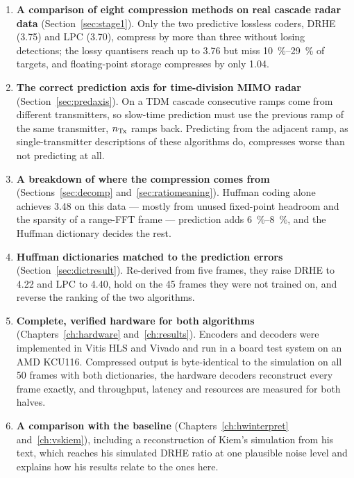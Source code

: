 \begin{enumerate}
\item \textbf{A comparison of eight compression methods on real cascade radar
data} (Section~\ref{sec:stage1}). Only the two predictive lossless coders, DRHE
(\num{3.75}) and LPC (\num{3.70}), compress by more than three without losing
detections; the lossy quantisers reach up to \num{3.76} but miss
\SIrange{10}{29}{\percent} of targets, and floating-point storage compresses by
only \num{1.04}.

\item \textbf{The correct prediction axis for time-division MIMO radar}
(Section~\ref{sec:predaxis}). On a TDM cascade consecutive ramps come from
different transmitters, so slow-time prediction must use the previous ramp of
the same transmitter, $n_{\mathrm{Tx}}$ ramps back. Predicting from the adjacent ramp, as
single-transmitter descriptions of these algorithms do, compresses worse than not
predicting at all.

\item \textbf{A breakdown of where the compression comes from}
(Sections~\ref{sec:decomp} and~\ref{sec:ratiomeaning}). Huffman coding alone
achieves \num{3.48} on this data --- mostly from unused fixed-point headroom and
the sparsity of a range-FFT frame --- prediction adds \SIrange{6}{8}{\percent},
and the Huffman dictionary decides the rest.

\item \textbf{Huffman dictionaries matched to the prediction errors}
(Section~\ref{sec:dictresult}). Re-derived from five frames, they raise DRHE to
\num{4.22} and LPC to \num{4.40}, hold on the 45 frames they were not trained
on, and reverse the ranking of the two algorithms.

\item \textbf{Complete, verified hardware for both algorithms}
(Chapters~\ref{ch:hardware} and~\ref{ch:results}). Encoders and decoders were
implemented in Vitis HLS and Vivado and run in a board test system on an AMD
KCU116. Compressed output is byte-identical to the simulation on all 50 frames
with both dictionaries, the hardware decoders reconstruct every frame exactly,
and throughput, latency and resources are measured for both halves.

\item \textbf{A comparison with the baseline} (Chapters~\ref{ch:hwinterpret} and~\ref{ch:vskiem}),
including a reconstruction of Kiem's simulation from his text, which reaches
his simulated DRHE ratio at one plausible noise level and explains how his
results relate to the ones here.
\end{enumerate}

